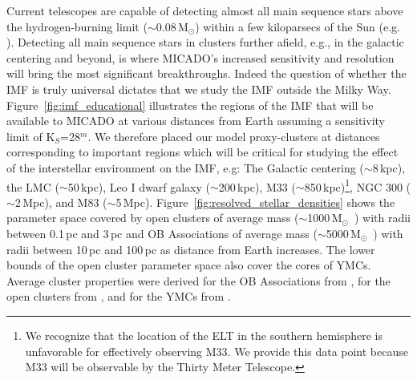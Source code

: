 \documentclass{aa}
\newcommand{\msun}{M$_\odot$~}
\newcommand{\msune}{M$_\odot$}
\newcommand{\s}{$\sim$}
\begin{document}
Current telescopes are capable of detecting almost all main sequence stars above the hydrogen-burning limit (\s0.08\,\msune) within a few kiloparsecs of the Sun (e.g. \citealt{muzic17}).
Detecting all main sequence stars in clusters further afield, e.g., in the galactic centering and beyond, is where MICADO's increased sensitivity and resolution will bring the most significant breakthroughs.
Indeed the question of whether the IMF is truly universal dictates that we study the IMF outside the Milky Way.
Figure~\ref{fig:imf_educational} illustrates the regions of the IMF that will be available to MICADO at various distances from Earth assuming a sensitivity limit of K$_S$=28$^m$.
We therefore placed our model proxy-clusters at distances corresponding to important regions which will be critical for studying the effect of the interstellar environment on the IMF, e.g: The Galactic centering (\s8\,kpc), the LMC (\s50\,kpc), Leo I dwarf galaxy (\s200\,kpc), M33 (\s850\,kpc)\footnote{We recognize that the location of the ELT in the southern hemisphere is unfavorable for effectively observing M33.
We provide this data point because M33 will be observable by the Thirty Meter Telescope.}, NGC 300 (\s2\,Mpc), and M83 (\s5\,Mpc).
Figure~\ref{fig:resolved_stellar_densities} shows the parameter space covered by open clusters of average mass (\s1000\,\msun) with radii between 0.1\,pc and 3\,pc and OB Associations of average mass (\s5000\,\msun) with radii between 10\,pc and 100\,pc as distance from Earth increases.
The lower bounds of the open cluster parameter space also cover the cores of YMCs. Average cluster properties were derived for the OB Associations from \citet{melnik1995}, for the open clusters from \citet{piskunov2007}, and for the YMCs from \citet{portegies2010}.
\end{document}
